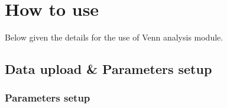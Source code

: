 \documentclass[
  a4paper,
  oneside,
  open=any]{scrreport}
\begin{document}
\hypertarget{how-to-use-9}{%
\section{How to use}\label{how-to-use-9}}

Below given the details for the use of Venn analysis module.

\hypertarget{data-upload-parameters-setup-6}{%
\subsection{Data upload \& Parameters
setup}\label{data-upload-parameters-setup-6}}

\hypertarget{parameters-setup-3}{%
\subsubsection{Parameters setup}\label{parameters-setup-3}}
\end{document}
